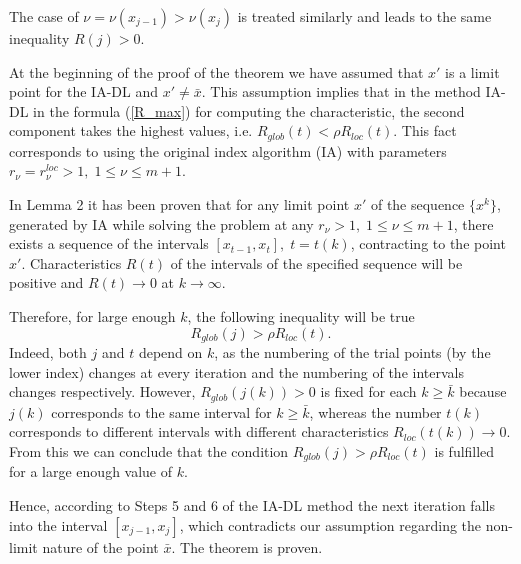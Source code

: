 \documentclass[twocolumn]{svjour3}          %
\begin{document}
	The case of $\nu=\nu(x_{j-1})>\nu(x_j)$ is treated similarly and leads to the same inequality $R(j)>0$.
	
	

	At the beginning of the proof of the theorem we have assumed that $x'$ is a limit point for the IA-DL and  $x' \neq \bar x$. This assumption implies that in the method IA-DL in the formula (\ref{R_max}) for computing the characteristic, the second component takes the highest values, i.e. $R_{glob}(t) < \rho R_{loc}(t)$. This fact corresponds to using the original index algorithm (IA) with parameters $r_\nu = r_\nu^{loc}>1, \; 1 \leq \nu \leq m+1$.

In Lemma 2 it has been proven that for any limit point $x'$ of the sequence $\{x^k\}$, generated by IA while solving the problem at any $r_\nu > 1, \; 1 \leq \nu \leq m+1$, there exists a sequence
of the intervals $[x_{t-1}, x_t], \; t=t(k)$, contracting to the point $x'$. Characteristics $R(t)$ of the intervals of the specified sequence will be positive and $R(t) \rightarrow 0$ at $k \rightarrow \infty$. 


	Therefore, for large enough $k$, the following inequality will be true
\begin{equation}
	R_{glob}(j) > \rho R_{loc}(t).
\end{equation}
Indeed, both $j$ and $t$ depend on $k$, as the numbering of the trial points (by the lower index) changes at every iteration and the numbering of the intervals changes respectively.
However, $R_{glob}(j(k))>0$ is fixed for each $k \geq \bar k$ because $j(k)$ corresponds to the same interval for $k \geq \bar k$, whereas the number $t(k)$ corresponds to different intervals with different characteristics $R_{loc}(t(k)) \rightarrow 0$. From this we can conclude that the condition $R_{glob}(j) > \rho R_{loc}(t)$ is fulfilled for a large enough value of $k$.


Hence, according to Steps 5 and 6 of the IA-DL method the next iteration falls into the interval $[x_{j-1}, x_j]$, which contradicts our assumption regarding the non-limit nature of the point $\bar x$. The theorem is proven.
\end{document}
